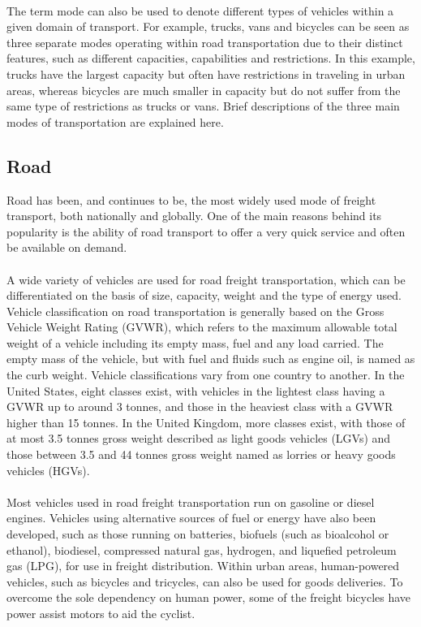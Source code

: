 \paragraph{}
The term mode can also be used to denote different types of vehicles
within a given domain of transport. For example, trucks, vans and bicycles can be seen as three separate modes operating within road transportation due to their distinct features, such as different capacities, capabilities and restrictions. In this example, trucks have the largest capacity but often have restrictions in traveling in urban areas, whereas bicycles are much smaller in capacity but do not suffer from the same type of restrictions as trucks or vans. Brief descriptions of the three main modes of transportation are explained here.
%
\subsection{Road}
Road has been, and continues to be, the most widely used mode of freight transport, both nationally and globally. One of the main reasons behind its popularity is the ability of road transport to offer a very quick service and often be available on demand.
\paragraph{}
A wide variety of vehicles are used for road freight transportation, which
can be differentiated on the basis of size, capacity, weight and the type of energy used. Vehicle classification on road transportation is generally based on the Gross Vehicle Weight Rating (GVWR), which refers to the maximum allowable total weight of a vehicle including its empty mass, fuel and any load carried. The empty mass of the vehicle, but with fuel and fluids such as engine oil, is named as the curb weight. Vehicle classifications vary from one country to another. In the United States, eight classes exist, with vehicles in the lightest class having a GVWR up to around 3 tonnes, and those in the heaviest class with a GVWR higher than 15 tonnes. In the United Kingdom, more classes exist, with those of at most 3.5 tonnes gross weight described as light goods vehicles (LGVs) and those between 3.5 and 44 tonnes gross weight named as lorries or heavy goods vehicles (HGVs).
\paragraph{}
Most vehicles used in road freight transportation run on gasoline or diesel engines. Vehicles using alternative sources of fuel or energy have also been developed, such as those running on batteries, biofuels (such as bioalcohol or ethanol), biodiesel, compressed natural gas, hydrogen, and liquefied petroleum gas (LPG), for use in freight distribution. Within urban areas, human-powered vehicles, such as bicycles and tricycles, can also be used for goods deliveries. To overcome the sole dependency on human power, some of the freight bicycles have power assist motors to aid the cyclist.
